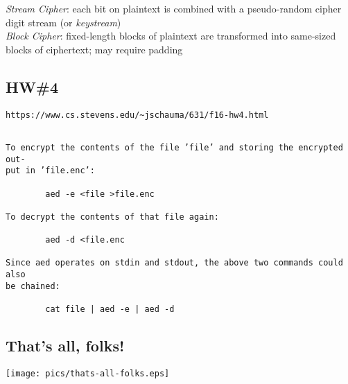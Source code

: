 \documentclass[xga]{xdvislides}
\begin{document}
{\em Stream Cipher}: each bit on plaintext is combined
with a pseudo-random cipher digit stream (or {\em keystream})
\\

{\em Block Cipher}: fixed-length blocks of plaintext
are transformed into same-sized blocks of ciphertext;
may require padding

\subsection{HW\#4}
\begin{verbatim}
https://www.cs.stevens.edu/~jschauma/631/f16-hw4.html
\end{verbatim}
\begin{verbatim}

To encrypt the contents of the file ’file’ and storing the encrypted out-
put in ’file.enc’:

        aed -e <file >file.enc

To decrypt the contents of that file again:

        aed -d <file.enc

Since aed operates on stdin and stdout, the above two commands could also
be chained:

        cat file | aed -e | aed -d
\end{verbatim}
\Normalsize

\subsection{That's all, folks!}

\begin{center}
	\texttt{[image: pics/thats-all-folks.eps]}
\end{center}
\end{document}
